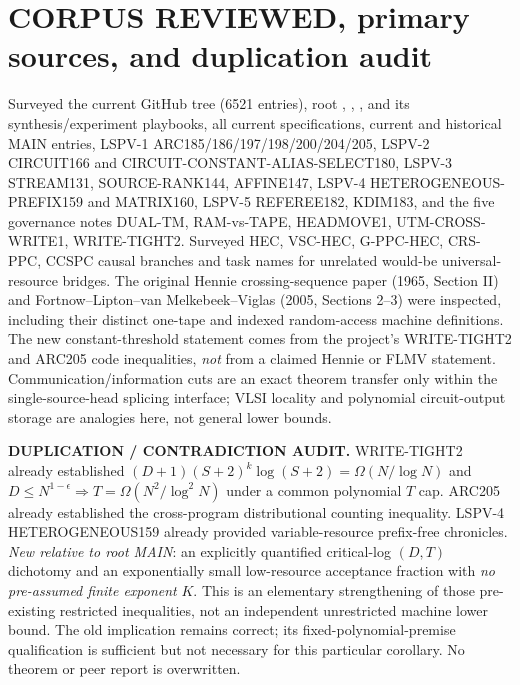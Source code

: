 \documentclass[11pt]{article}
\begin{document}
\section{CORPUS REVIEWED, primary sources, and duplication audit}
Surveyed the current GitHub tree (6521 entries), root , , ,
 and its synthesis/experiment playbooks,
all current  specifications,
current and historical MAIN entries, LSPV-1 ARC185/186/197/198/200/204/205,
LSPV-2 CIRCUIT166 and CIRCUIT-CONSTANT-ALIAS-SELECT180,
LSPV-3 STREAM131, SOURCE-RANK144, AFFINE147,
LSPV-4 HETEROGENEOUS-PREFIX159 and MATRIX160,
LSPV-5 REFEREE182, KDIM183, and the five governance notes
DUAL-TM, RAM-vs-TAPE, HEADMOVE1, UTM-CROSS-WRITE1, WRITE-TIGHT2.
Surveyed HEC, VSC-HEC, G-PPC-HEC, CRS-PPC, CCSPC
causal branches and task names for unrelated would-be universal-resource bridges.
The original Hennie crossing-sequence paper (1965, Section II) and
Fortnow--Lipton--van Melkebeek--Viglas (2005, Sections 2--3)
were inspected, including their distinct one-tape and indexed random-access machine definitions.
The new constant-threshold statement comes from the project's
WRITE-TIGHT2 and ARC205 code inequalities, \emph{not} from a claimed Hennie or FLMV statement.
Communication/information cuts are an exact theorem transfer only within the
single-source-head splicing interface; VLSI locality and
polynomial circuit-output storage are analogies here, not general lower bounds.

\noindent\textbf{DUPLICATION / CONTRADICTION AUDIT.}
WRITE-TIGHT2 already established $(D+1)(S+2)^k\log(S+2)=\Omega(N/\log N)$
and $D\le N^{1-\epsilon}\Rightarrow T=\Omega(N^2/\log^2N)$ under a common polynomial $T$ cap.
ARC205 already established the cross-program distributional counting inequality.
LSPV-4 HETEROGENEOUS159 already provided variable-resource prefix-free chronicles.
\emph{New relative to root MAIN}: an explicitly quantified critical-log $(D,T)$ dichotomy and
an exponentially small low-resource acceptance fraction with \emph{no pre-assumed finite exponent} $K$.
This is an elementary strengthening of those pre-existing restricted inequalities,
not an independent unrestricted machine lower bound.
The old implication remains correct; its fixed-polynomial-premise
qualification is sufficient but not necessary for this particular corollary.
No theorem or peer report is overwritten.
\end{document}
